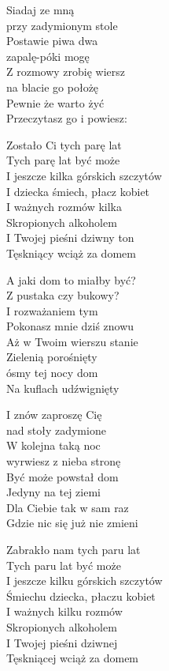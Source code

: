 \begin{text}
    \hfill\break
Siadaj ze mną\\
przy zadymionym stole\\
Postawie piwa dwa\\
zapalę-póki mogę\\
Z rozmowy zrobię wiersz\\
na blacie go położę\\
Pewnie że warto żyć\\
Przeczytasz go i powiesz:

    \vin Zostało Ci tych parę lat\\
    \vin Tych parę lat być może\\
    \vin I jeszcze kilka górskich szczytów\\
    \vin I dziecka śmiech, płacz kobiet\\
    \vin I ważnych rozmów kilka\\
    \vin Skropionych alkoholem\\
    \vin I Twojej pieśni dziwny ton\\
    \vin Tęskniący wciąż za domem

A jaki dom to miałby być?\\
Z pustaka czy bukowy?\\
I rozważaniem tym\\
Pokonasz mnie dziś znowu\\
Aż w Twoim wierszu stanie\\
Zielenią porośnięty\\
ósmy tej nocy dom\\
Na kuflach udźwignięty

I znów zaproszę Cię\\
nad stoły zadymione\\
W kolejna taką noc\\
wyrwiesz z nieba stronę\\
Być może powstał dom\\
Jedyny na tej ziemi\\
Dla Ciebie tak w sam raz\\
Gdzie nic się już nie zmieni

\vin Zabrakło nam tych paru lat\\
\vin Tych paru lat być może\\
\vin I jeszcze kilku górskich szczytów\\
\vin Śmiechu dziecka, płaczu kobiet\\
\vin I ważnych kilku rozmów\\
\vin Skropionych alkoholem\\
\vin I Twojej pieśni dziwnej\\
\vin Tęskniącej wciąż za domem
\end{text}
